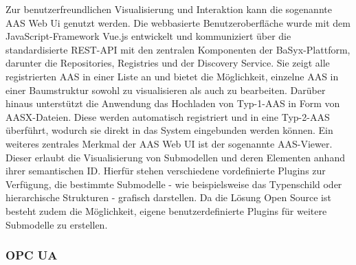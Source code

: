 Zur benutzerfreundlichen Visualisierung und Interaktion kann die sogenannte AAS Web Ui genutzt werden.
Die webbasierte Benutzeroberfläche wurde mit dem JavaScript-Framework Vue.js entwickelt und kommuniziert über die standardisierte REST-API mit den zentralen Komponenten der BaSyx-Plattform, darunter die Repositories, Registries und der Discovery Service.
Sie zeigt alle registrierten AAS in einer Liste an und bietet die Möglichkeit, einzelne AAS in einer Baumstruktur sowohl zu visualisieren als auch zu bearbeiten. 
Darüber hinaus unterstützt die Anwendung das Hochladen von Typ-1-AAS in Form von AASX-Dateien. Diese werden automatisch registriert und in eine Typ-2-AAS überführt, wodurch sie direkt in das System eingebunden werden können.
Ein weiteres zentrales Merkmal der AAS Web UI ist der sogenannte AAS-Viewer.
Dieser erlaubt die Visualisierung von Submodellen und deren Elementen anhand ihrer semantischen ID. 
Hierfür stehen verschiedene vordefinierte Plugins zur Verfügung, die bestimmte Submodelle - wie beispielsweise das Typenschild oder hierarchische Strukturen - grafisch darstellen.
Da die Lösung Open Source ist besteht zudem die Möglichkeit, eigene benutzerdefinierte Plugins für weitere Submodelle zu erstellen. \cite{BaSyxWiki} \cite{BaSyxEclipse}

\subsubsection{OPC UA}